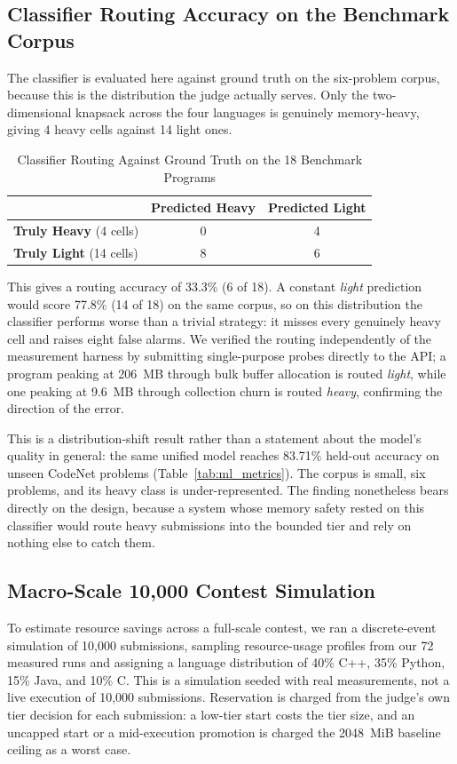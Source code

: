 \documentclass[conference]{IEEEtran}
\begin{document}
\subsection{Classifier Routing Accuracy on the Benchmark Corpus}
\label{sec:classifier_eval}
The classifier is evaluated here against ground truth on the six-problem corpus, because this is the distribution the judge actually serves. Only the two-dimensional knapsack across the four languages is genuinely memory-heavy, giving 4 heavy cells against 14 light ones.

\begin{table}[!t]
\caption{Classifier Routing Against Ground Truth on the 18 Benchmark Programs}
\label{tab:classifier_routing}
\centering
\small
\begin{tabular}{|l|c|c|}
\hline
& \textbf{Predicted Heavy} & \textbf{Predicted Light} \\
\hline
\textbf{Truly Heavy} (4 cells) & 0 & 4 \\
\hline
\textbf{Truly Light} (14 cells) & 8 & 6 \\
\hline
\end{tabular}
\end{table}

This gives a routing accuracy of 33.3\% (6 of 18). A constant \emph{light} prediction would score 77.8\% (14 of 18) on the same corpus, so on this distribution the classifier performs worse than a trivial strategy: it misses every genuinely heavy cell and raises eight false alarms. We verified the routing independently of the measurement harness by submitting single-purpose probes directly to the API; a program peaking at 206~MB through bulk buffer allocation is routed \emph{light}, while one peaking at 9.6~MB through collection churn is routed \emph{heavy}, confirming the direction of the error.

This is a distribution-shift result rather than a statement about the model's quality in general: the same unified model reaches 83.71\% held-out accuracy on unseen CodeNet problems (Table~\ref{tab:ml_metrics}). The corpus is small, six problems, and its heavy class is under-represented. The finding nonetheless bears directly on the design, because a system whose memory safety rested on this classifier would route heavy submissions into the bounded tier and rely on nothing else to catch them.

\subsection{Macro-Scale 10,000 Contest Simulation}
To estimate resource savings across a full-scale contest, we ran a discrete-event simulation of 10,000 submissions, sampling resource-usage profiles from our 72 measured runs and assigning a language distribution of 40\% C++, 35\% Python, 15\% Java, and 10\% C. This is a simulation seeded with real measurements, not a live execution of 10,000 submissions. Reservation is charged from the judge's own tier decision for each submission: a low-tier start costs the tier size, and an uncapped start or a mid-execution promotion is charged the 2048~MiB baseline ceiling as a worst case.
\end{document}
